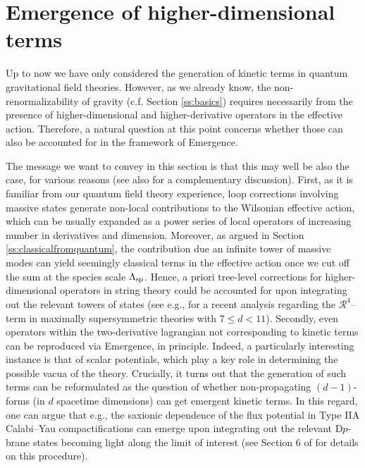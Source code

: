 \section{Emergence of higher-dimensional terms}
\label{s:emergenceinteractions}

Up to now we have only considered the generation of kinetic terms in quantum gravitational field theories. However, as we already know, the non-renormalizability of gravity (c.f. Section \ref{ss:basics}) requires necessarily from the presence of higher-dimensional and higher-derivative operators in the effective action. Therefore, a natural question at this point concerns whether those can also be accounted for in the framework of Emergence.

The message we want to convey in this section is that this may well be also the case, for various reasons (see also \cite{Lee:2021qkx} for a complementary discussion). First, as it is familiar from our quantum field theory experience, loop corrections involving massive states generate non-local contributions to the Wilsonian effective action, which can be usually expanded as a power series of local operators of increasing number in derivatives and dimension. Moreover, as argued in Section \ref{ss:classicalfromquantum}, the contribution due an infinite tower of massive modes can yield seemingly classical terms in the effective action once we cut off the sum at the species scale $\Lambda_{\text{sp}}$. Hence, a priori tree-level corrections for higher-dimensional operators in string theory could be accounted for upon integrating out the relevant towers of states (see e.g., \cite{Blumenhagen:2024ydy} for a recent analysis regarding the $\mathcal{R}^4$--\,term in maximally supersymmetric theories with $7 \leq d < 11$). Secondly, even operators within the two-derivative lagrangian not corresponding to kinetic terms can be reproduced via Emergence, in principle. Indeed, a particularly interesting instance is that of scalar potentials, which play a key role in determining the possible vacua of the theory. Crucially, it turns out that the generation of such terms can be reformulated as the question of whether non-propagating $(d-1)$-forms (in $d$ spacetime dimensions) \cite{Herraez:2018vae,Bielleman:2015ina,Carta:2016ynn} can get emergent kinetic terms. In this regard, one can argue that e.g., the saxionic dependence of the flux potential in Type IIA Calabi--Yau compactifications can emerge upon integrating out the relevant D$p$-brane states becoming light along the limit of interest (see Section 6 of \cite{Castellano:2022bvr} for details on this procedure).

